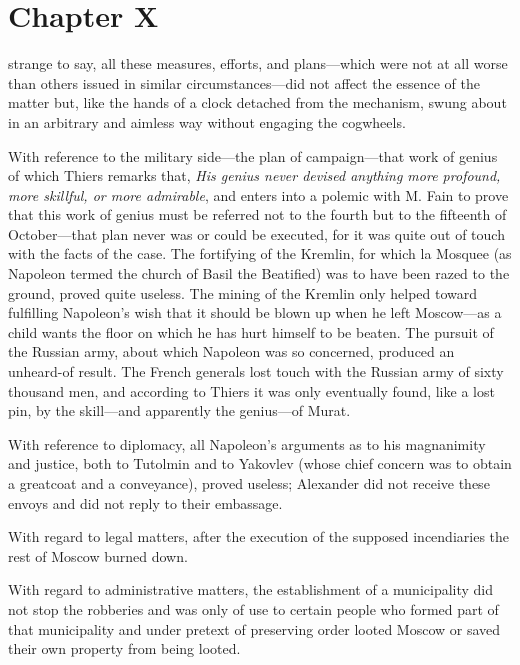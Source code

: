 \chapter*{Chapter X} \ifaudio {}
\fi

 strange to say, all these measures, efforts, and
plans---which were not at all worse than others issued in similar
circumstances---did not affect the essence of the matter but,
like the hands of a clock detached from the mechanism, swung
about in an arbitrary and aimless way without engaging the
cogwheels.

With reference to the military side---the plan of campaign---that
work of genius of which Thiers remarks that, \emph{His genius
never devised anything more profound, more skillful, or more
admirable}, and enters into a polemic with M. Fain to prove that
this work of genius must be referred not to the fourth but to the
fifteenth of October---that plan never was or could be executed,
for it was quite out of touch with the facts of the case. The
fortifying of the Kremlin, for which la Mosquee (as Napoleon
termed the church of Basil the Beatified) was to have been razed
to the ground, proved quite useless. The mining of the Kremlin
only helped toward fulfilling Napoleon's wish that it should be
blown up when he left Moscow---as a child wants the floor on
which he has hurt himself to be beaten. The pursuit of the
Russian army, about which Napoleon was so concerned, produced an
unheard-of result. The French generals lost touch with the
Russian army of sixty thousand men, and according to Thiers it
was only eventually found, like a lost pin, by the skill---and
apparently the genius---of Murat.

With reference to diplomacy, all Napoleon's arguments as to his
magnanimity and justice, both to Tutolmin and to Yakovlev (whose
chief concern was to obtain a greatcoat and a conveyance), proved
useless; Alexander did not receive these envoys and did not reply
to their embassage.

With regard to legal matters, after the execution of the supposed
incendiaries the rest of Moscow burned down.

With regard to administrative matters, the establishment of a
municipality did not stop the robberies and was only of use to
certain people who formed part of that municipality and under
pretext of preserving order looted Moscow or saved their own
property from being looted.

